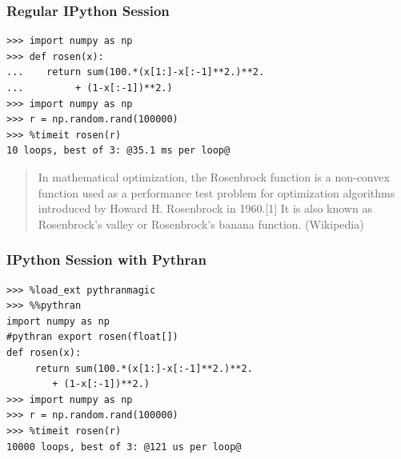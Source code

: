 \documentclass[aspectratio=1610]{beamer}
\begin{document}
\begin{frame}[fragile]
    \frametitle{Regular IPython Session}
\begin{lstlisting}
>>> import numpy as np
>>> def rosen(x):
...    return sum(100.*(x[1:]-x[:-1]**2.)**2.
...         + (1-x[:-1])**2.)
>>> import numpy as np
>>> r = np.random.rand(100000)
>>> %timeit rosen(r)
10 loops, best of 3: @35.1 ms per loop@
\end{lstlisting}

\begin{quote}
In mathematical optimization, the Rosenbrock function is a non-convex function used as a performance test problem for optimization algorithms introduced by Howard H. Rosenbrock in 1960.[1] It is also known as Rosenbrock's valley or Rosenbrock's banana function. (Wikipedia)
\end{quote}

\end{frame}


\begin{frame}[fragile]
    \frametitle{IPython Session with Pythran}
\begin{lstlisting}
>>> %load_ext pythranmagic
>>> %%pythran
import numpy as np
#pythran export rosen(float[])
def rosen(x):
     return sum(100.*(x[1:]-x[:-1]**2.)**2.
        + (1-x[:-1])**2.)
>>> import numpy as np
>>> r = np.random.rand(100000)
>>> %timeit rosen(r)
10000 loops, best of 3: @121 us per loop@
\end{lstlisting}
\vfill
{}
\vfill

\end{frame}
\end{document}
